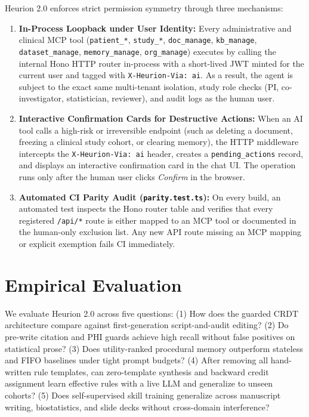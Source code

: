 \documentclass[11pt,a4paper]{article}
\begin{document}
Heurion 2.0 enforces strict permission symmetry through three mechanisms:
\begin{enumerate}[leftmargin=1.5em,itemsep=2pt]
  \item \textbf{In-Process Loopback under User Identity:} Every administrative and clinical MCP tool (\texttt{patient\_*}, \texttt{study\_*}, \texttt{doc\_manage}, \texttt{kb\_manage}, \texttt{dataset\_manage}, \texttt{memory\_manage}, \texttt{org\_manage}) executes by calling the internal Hono HTTP router in-process with a short-lived JWT minted for the current user and tagged with \texttt{X-Heurion-Via: ai}. As a result, the agent is subject to the exact same multi-tenant isolation, study role checks (PI, co-investigator, statistician, reviewer), and audit logs as the human user.
  \item \textbf{Interactive Confirmation Cards for Destructive Actions:} When an AI tool calls a high-risk or irreversible endpoint (such as deleting a document, freezing a clinical study cohort, or clearing memory), the HTTP middleware intercepts the \texttt{X-Heurion-Via: ai} header, creates a \texttt{pending\_actions} record, and displays an interactive confirmation card in the chat UI. The operation runs only after the human user clicks \emph{Confirm} in the browser.
  \item \textbf{Automated CI Parity Audit (\texttt{parity.test.ts}):} On every build, an automated test inspects the Hono router table and verifies that every registered \texttt{/api/*} route is either mapped to an MCP tool or documented in the human-only exclusion list. Any new API route missing an MCP mapping or explicit exemption fails CI immediately.
\end{enumerate}

\section{Empirical Evaluation}
\label{sec:evaluation}

We evaluate Heurion 2.0 across five questions:
(1) How does the guarded CRDT architecture compare against first-generation script-and-audit editing?
(2) Do pre-write citation and PHI guards achieve high recall without false positives on statistical prose?
(3) Does utility-ranked procedural memory outperform stateless and FIFO baselines under tight prompt budgets?
(4) After removing all hand-written rule templates, can zero-template synthesis and backward credit assignment learn effective rules with a live LLM and generalize to unseen cohorts?
(5) Does self-supervised skill training generalize across manuscript writing, biostatistics, and slide decks without cross-domain interference?
\end{document}
